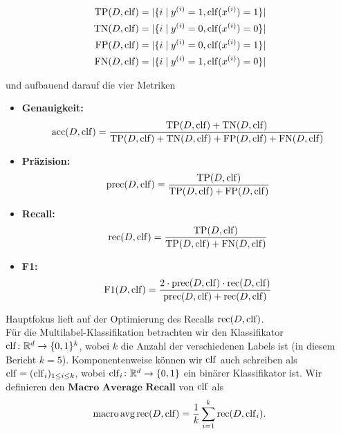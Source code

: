 \begin{align*}
    \tp(D, \clf) & = |\{i \mid y^{(i)} = 1, \clf(x^{(i)}) = 1\}| \\
    \tn(D, \clf) & = |\{i \mid y^{(i)} = 0, \clf(x^{(i)}) = 0\}| \\
    \fp(D, \clf) & = |\{i \mid y^{(i)} = 0, \clf(x^{(i)}) = 1\}| \\
    \fn(D, \clf) & = |\{i \mid y^{(i)} = 1, \clf(x^{(i)}) = 0\}|
\end{align*}

und aufbauend darauf die vier Metriken

\begin{itemize}
    \item \textbf{Genauigkeit:}
          \begin{equation*}
              \acc(D, \clf) = \frac{\tp(D, \clf) + \tn(D, \clf)}{\tp(D, \clf) + \tn(D, \clf) + \fp(D, \clf) + \fn(D, \clf)}
          \end{equation*}
    \item \textbf{Präzision:}
          \begin{equation*}
              \prec(D, \clf) = \frac{\tp(D, \clf)}{\tp(D, \clf) + \fp(D, \clf)}
          \end{equation*}
    \item \textbf{Recall:}
          \begin{equation*}
              \rec(D, \clf) = \frac{\tp(D, \clf)}{\tp(D, \clf) + \fn(D, \clf)}
          \end{equation*}
    \item \textbf{F1:}
          \begin{equation*}
              \fscore(D, \clf) = \frac{2 \cdot \prec(D, \clf) \cdot \rec(D, \clf)}{\prec(D, \clf) + \rec(D, \clf)}
          \end{equation*}
\end{itemize}
Hauptfokus lieft auf der Optimierung des Recalls $\rec(D, \clf)$. \\

Für die Multilabel-Klassifikation betrachten wir den Klassifikator $\clf\colon\mathbb{R}^d\to\{0, 1\}^k$, wobei $k$ die Anzahl der verschiedenen Labels ist (in diesem Bericht $k=5$). Komponentenweise können wir $\clf$ auch schreiben als $\clf = (\clf_i)_{1\leq i\leq k}$, wobei $\clf_i\colon\mathbb{R}^d\to\{0, 1\}$ ein binärer Klassifikator ist. Wir definieren den $\textbf{Macro Average Recall}$ von $\clf$ als
\begin{equation*}
    \operatorname{macro\,avg\,rec}(D, \clf) = \frac{1}{k}\sum_{i=1}^k\rec (D, \clf_i).
\end{equation*}

